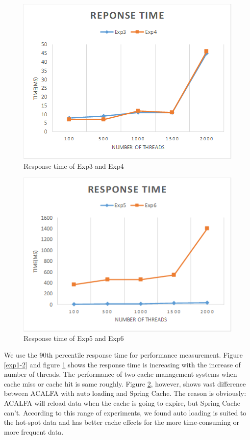\documentclass{singlecol-new}
\theoremstyle{TH}{
\newtheorem{lemma}{Lemma}
\newtheorem{theorem}[lemma]{Theorem}
\newtheorem{corrolary}[lemma]{Corrolary}
\newtheorem{conjecture}[lemma]{Conjecture}
\newtheorem{proposition}[lemma]{Proposition}
\newtheorem{claim}[lemma]{Claim}
\newtheorem{stheorem}[lemma]{Wrong Theorem}
}
\theoremstyle{THrm}{
\newtheorem{definition}{Definition}[section]
\newtheorem{question}{Question}[section]
\newtheorem{remark}{Remark}
\newtheorem{scheme}{Scheme}
}
\theoremstyle{THhit}{
\newtheorem{case}{Case}[section]
}
\begin{document}
\begin{figure} [htb]
    \centering
    \includegraphics[width=1\linewidth]{img/exp3-4.png}
    \caption{Response time of Exp3 and Exp4}
    \label{exp3-4}
\end{figure}

\begin{figure} [htb]
    \centering
    \includegraphics[width=1\linewidth]{img/exp5-6.png}
    \caption{Response time of Exp5 and Exp6}
    \label{exp5-6}
\end{figure}

We use the 90th percentile response time for performance measurement. Figure \ref{exp1-2} and figure \ref{exp3-4} shows the response time is increasing with the increase of number of threads. The performance of two cache management systems when cache miss or cache hit is same roughly. Figure \ref{exp5-6}, however, shows vast difference between ACALFA with auto loading and Spring Cache. The reason is obviously: ACALFA will reload data when the cache is going to expire, but Spring Cache can't. According to this range of experiments, we found auto loading is suited to the hot-spot data and has better cache effects for the more time-consuming or more frequent data.
\end{document}
